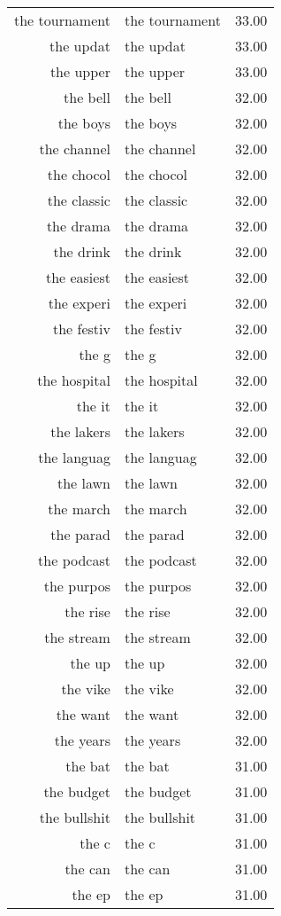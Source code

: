\begin{table}[ht]
\begin{tabular}{rlr}
  the tournament & the tournament & 33.00 \\ 
  the updat & the updat & 33.00 \\ 
  the upper & the upper & 33.00 \\ 
  the bell & the bell & 32.00 \\ 
  the boys & the boys & 32.00 \\ 
  the channel & the channel & 32.00 \\ 
  the chocol & the chocol & 32.00 \\ 
  the classic & the classic & 32.00 \\ 
  the drama & the drama & 32.00 \\ 
  the drink & the drink & 32.00 \\ 
  the easiest & the easiest & 32.00 \\ 
  the experi & the experi & 32.00 \\ 
  the festiv & the festiv & 32.00 \\ 
  the g & the g & 32.00 \\ 
  the hospital & the hospital & 32.00 \\ 
  the it & the it & 32.00 \\ 
  the lakers & the lakers & 32.00 \\ 
  the languag & the languag & 32.00 \\ 
  the lawn & the lawn & 32.00 \\ 
  the march & the march & 32.00 \\ 
  the parad & the parad & 32.00 \\ 
  the podcast & the podcast & 32.00 \\ 
  the purpos & the purpos & 32.00 \\ 
  the rise & the rise & 32.00 \\ 
  the stream & the stream & 32.00 \\ 
  the up & the up & 32.00 \\ 
  the vike & the vike & 32.00 \\ 
  the want & the want & 32.00 \\ 
  the years & the years & 32.00 \\ 
  the bat & the bat & 31.00 \\ 
  the budget & the budget & 31.00 \\ 
  the bullshit & the bullshit & 31.00 \\ 
  the c & the c & 31.00 \\ 
  the can & the can & 31.00 \\ 
  the ep & the ep & 31.00 \\ 

\end{tabular}
\end{table}
